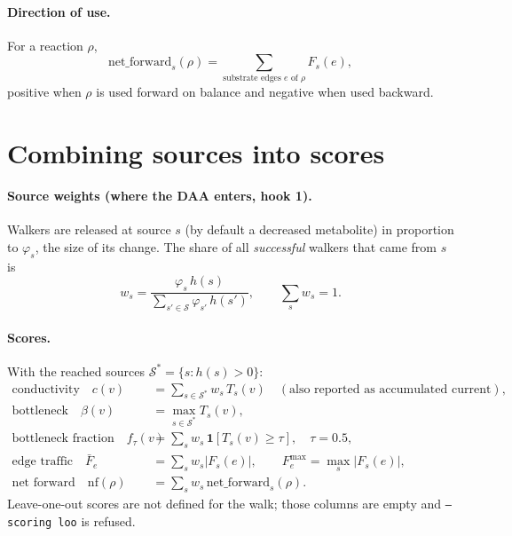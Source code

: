\documentclass[11pt]{article}
\newcommand{\code}[1]{\texttt{#1}}
\newcommand{\Sset}{\mathcal{S}}
\begin{document}
\paragraph{Direction of use.} For a reaction $\rho$,
\[
  \mathrm{net\_forward}_s(\rho) = \sum_{\text{substrate edges } e \text{ of } \rho} F_s(e),
\]
positive when $\rho$ is used forward on balance and negative when used backward.

\section{Combining sources into scores}

\paragraph{Source weights (where the DAA enters, hook 1).} Walkers are released at
source $s$ (by default a decreased metabolite) in proportion to $\varphi_s$, the size
of its change. The share of all \emph{successful} walkers
that came from $s$ is
\begin{equation}
  w_s = \frac{\varphi_s\,h(s)}{\sum_{s'\in\Sset}\varphi_{s'}\,h(s')} ,
  \qquad \textstyle\sum_s w_s = 1 .
  \label{eq:weights}
\end{equation}

\paragraph{Scores.} With the reached sources $\Sset^{*}=\{s: h(s)>0\}$:
\begin{align}
  \text{conductivity}\quad c(v) &= \textstyle\sum_{s\in\Sset^{*}} w_s\,T_s(v)
     \quad(\text{also reported as accumulated current}),\\
  \text{bottleneck}\quad \beta(v) &= \max_{s\in\Sset^{*}} T_s(v),\\
  \text{bottleneck fraction}\quad f_\tau(v) &= \textstyle\sum_{s} w_s\,\mathbf 1[T_s(v)\ge\tau],\quad\tau=0.5,\\
  \text{edge traffic}\quad \bar F_e &= \textstyle\sum_s w_s |F_s(e)|,\qquad F^{\max}_e=\max_s|F_s(e)|,\\
  \text{net forward}\quad \mathrm{nf}(\rho) &= \textstyle\sum_s w_s\,\mathrm{net\_forward}_s(\rho).
\end{align}
Leave-one-out scores are not defined for the walk; those columns are empty and
\code{--scoring loo} is refused.
\end{document}
